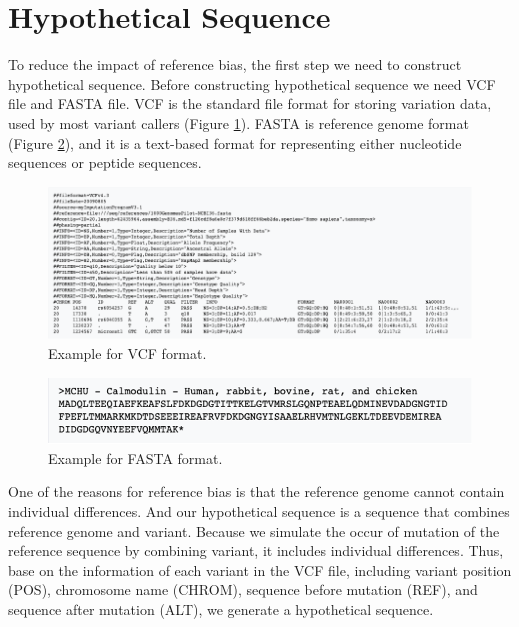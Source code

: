 \section{Hypothetical Sequence}
To reduce the impact of reference bias, the first step we need to construct hypothetical sequence. Before constructing hypothetical sequence we need VCF file and FASTA file. VCF is the standard file format for storing variation data, used by most variant callers (Figure \ref{f3-2}). FASTA is reference genome format (Figure \ref{f3-3}), and it is a text-based format for representing either nucleotide sequences or peptide sequences.

\begin{figure}[H]
    \centering
    \includegraphics[width=1\columnwidth]{body/image/3-2.png}
    \captionsetup{labelfont=bf}
    \renewcommand{\baselinestretch}{1.0}
    \vspace{-1cm}
    \caption[VCF format]{Example for VCF format.}
    \label{f3-2}
\end{figure}

\begin{figure}[H]
    \centering
    \includegraphics[width=1\columnwidth]{body/image/3-3.png}
    \captionsetup{labelfont=bf}
    \renewcommand{\baselinestretch}{1.0}
    \vspace{-1cm}
    \caption[FASTA format]{Example for FASTA format.}
    \label{f3-3}
\end{figure}

One of the reasons for reference bias is that the reference genome cannot contain individual differences. And our hypothetical sequence is a sequence that combines reference genome and variant. Because we simulate the occur of mutation of the reference sequence by combining variant, it includes individual differences. Thus, base on the information of each variant in the VCF file, including variant position (POS), chromosome name (CHROM), sequence before mutation (REF), and sequence after mutation (ALT), we generate a hypothetical sequence. 

